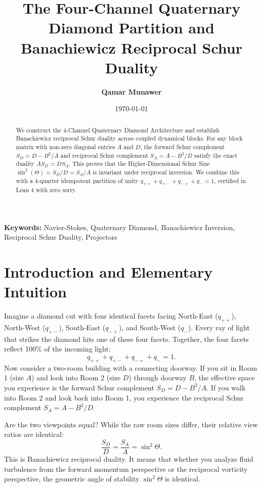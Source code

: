 \documentclass[11pt,a4paper]{article}
\title{\textbf{The Four-Channel Quaternary Diamond Partition and Banachiewicz Reciprocal Schur Duality}}
\author{\textbf{Qamar Munawer}}
\date{\today}
\theoremstyle{definition}
\begin{document}
\maketitle

\begin{abstract}
We construct the 4-Channel Quaternary Diamond Architecture and establish Banachiewicz reciprocal Schur duality across coupled dynamical blocks. For any block matrix with non-zero diagonal entries $A$ and $D$, the forward Schur complement $S_D = D - B^2 / A$ and reciprocal Schur complement $S_A = A - B^2 / D$ satisfy the exact duality $A S_D = D S_A$. This proves that the Higher-Dimensional Schur Sine $\sin^2(\Theta) = S_D / D = S_A / A$ is invariant under reciprocal inversion. We combine this with a 4-quarter idempotent partition of unity $q_{++} + q_{+-} + q_{-+} + q_{ - } = 1$, certified in Lean 4 with zero sorry.
\end{abstract}

\vspace{1em}
\noindent\textbf{Keywords:} Navier-Stokes, Quaternary Diamond, Banachiewicz Inversion, Reciprocal Schur Duality, Projectors

\section{Introduction and Elementary Intuition}

Imagine a diamond cut with four identical facets facing North-East ($q_{++}$), North-West ($q_{+-}$), South-East ($q_{-+}$), and South-West ($q_{ - }$). Every ray of light that strikes the diamond hits one of these four facets. Together, the four facets reflect 100\% of the incoming light:
\begin{equation}
q_{++} + q_{+-} + q_{-+} + q_{ - } = 1.
\end{equation}
Now consider a two-room building with a connecting doorway. If you sit in Room 1 (size $A$) and look into Room 2 (size $D$) through doorway $B$, the effective space you experience is the forward Schur complement $S_D = D - B^2 / A$. If you walk into Room 2 and look back into Room 1, you experience the reciprocal Schur complement $S_A = A - B^2 / D$.

Are the two viewpoints equal? While the raw room sizes differ, their relative view ratios are identical:
\begin{equation}
\frac{S_D}{D} = \frac{S_A}{A} = \sin^2\Theta.
\end{equation}
This is Banachiewicz reciprocal duality. It means that whether you analyze fluid turbulence from the forward momentum perspective or the reciprocal vorticity perspective, the geometric angle of stability $\sin^2\Theta$ is identical.
\end{document}
